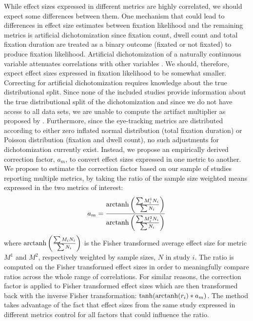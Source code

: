 While effect sizes expressed in different metrics are highly correlated, we should expect some differences between them. One mechanism that could lead to differences in effect size estimates between fixation likelihood and the remaining metrics is artificial dichotomization since fixation count, dwell count and total fixation duration are treated as a binary outcome (fixated or not fixated) to produce fixation likelihood. Artificial dichotomization of a naturally continuous variable attenuates correlations with other variables \citep{hunter2004a}. We should, therefore, expect effect sizes expressed in fixation likelihood to be somewhat smaller. Correcting for artificial dichotomization requires knowledge about the true distributional split. Since none of the included studies provide information about the true distributional split of the dichotomization and since we do not have access to all data sets, we are unable to compute the artifact multiplier as proposed by \cite{hunter2004a}. Furthermore, since the eye-tracking metrics are distributed according to either zero inflated normal distribution (total fixation duration) or Poisson distribution (fixation and dwell count), no such adjustments for dichotomization currently exist. Instead, we propose an empirically derived correction factor, $a_m$, to convert effect sizes expressed in one metric to another. We propose to estimate the correction factor based on our sample of studies reporting multiple metrics, by taking the ratio of the sample size weighted means expressed in the two metrics of interest:
%
\begin{equation}
\label{eq:metrics_correction}
a_m = \frac{\operatorname{arctanh} \left( \frac{\sum M_i^1 N_i}{\sum N_i} \right)}{\operatorname{arctanh} \left( \frac{\sum M_i^2 N_i}{\sum N_i} \right)}
\end{equation}
%
where $\operatorname{arctanh} \left( \frac{\sum M_i N_i}{\sum N_i} \right)$ is the Fisher transformed average effect size for metric $M^1$ and $M^2$, respectively weighted by sample sizes, $N$ in study $i$. The ratio is computed on the Fisher transformed effect sizes in order to meaningfully compare ratios across the whole range of correlations. For similar reasons, the correction factor is applied to Fisher transformed effect sizes which are then transformed back with the inverse Fisher transformation: $\tanh(\operatorname{arctanh}(r_i)*a_m)$. The method takes advantage of the fact that effect sizes from the same study expressed in different metrics control for all factors that could influence the ratio.\\    
